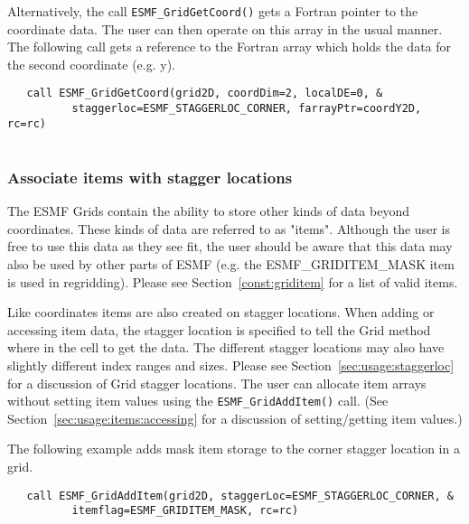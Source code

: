 
   Alternatively, the call {\tt ESMF\_GridGetCoord()} gets a Fortran pointer to
   the coordinate data. The user can then operate on this array in the usual
   manner. The following call gets a reference to the
   Fortran array which holds the data for the second coordinate (e.g. y). 

 \begin{verbatim}
   call ESMF_GridGetCoord(grid2D, coordDim=2, localDE=0, &
          staggerloc=ESMF_STAGGERLOC_CORNER, farrayPtr=coordY2D, rc=rc)
 
\end{verbatim}
 

  \subsubsection{Associate items with stagger locations}
  \label{sec:usage:items}
  
   The ESMF Grids contain the ability to store other kinds of
   data beyond coordinates. These kinds of data are referred to
   as "items". Although the user is free to use this
   data as they see fit, the user should be aware that
   this data may also be used by other parts of ESMF (e.g. the
   ESMF\_GRIDITEM\_MASK item is used in regridding).
   Please see Section~\ref{const:griditem} for a list of valid
   items.
  
   Like coordinates items are also created on stagger locations.
   When adding or accessing item data, the stagger location is specified to tell the Grid method
   where in the cell to get the data. The different stagger locations may also have slightly different
   index ranges and sizes.  Please see Section~\ref{sec:usage:staggerloc} for a discussion of
   Grid stagger locations.  The user can
   allocate item arrays without setting item values using the {\tt ESMF\_GridAddItem()} call.
   (See Section~\ref{sec:usage:items:accessing} for a discussion of setting/getting item values.)
  
   The following example adds mask item storage to the corner stagger location in a grid. 

 \begin{verbatim}
   call ESMF_GridAddItem(grid2D, staggerLoc=ESMF_STAGGERLOC_CORNER, &
          itemflag=ESMF_GRIDITEM_MASK, rc=rc)
 
\end{verbatim}
 
